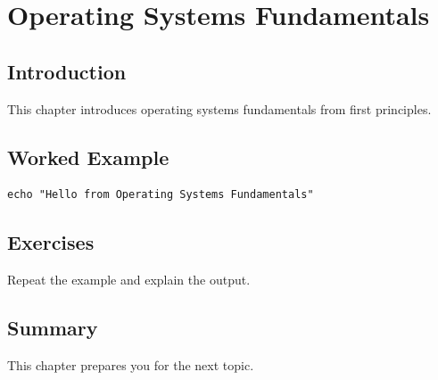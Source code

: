 \chapter{Operating Systems Fundamentals}
\label{chap:31}
\section{Introduction}
This chapter introduces operating systems fundamentals from first principles.

\section{Worked Example}
\begin{lstlisting}
echo "Hello from Operating Systems Fundamentals"
\end{lstlisting}

\section{Exercises}
\begin{exercise}
Repeat the example and explain the output.
\end{exercise}

\section{Summary}
This chapter prepares you for the next topic.
